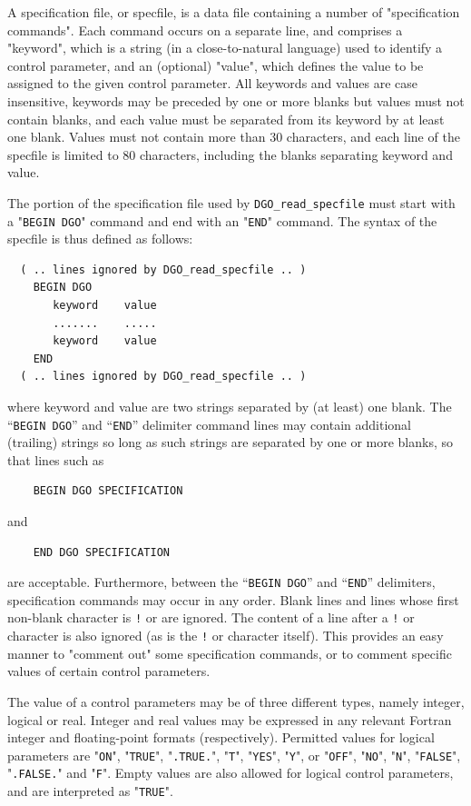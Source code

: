 \documentclass{galahad}
\newcommand{\packagename}{DGO}
\begin{document}
A specification file, or specfile, is a data file containing a number of
"specification commands". Each command occurs on a separate line,
and comprises a "keyword",
which is a string (in a close-to-natural language) used to identify a
control parameter, and
an (optional) "value", which defines the value to be assigned to the given
control parameter. All keywords and values are case insensitive,
keywords may be preceded by one or more blanks but
values must not contain blanks, and
each value must be separated from its keyword by at least one blank.
Values must not contain more than 30 characters, and
each line of the specfile is limited to 80 characters,
including the blanks separating keyword and value.

The portion of the specification file used by
{\tt \packagename\_read\_specfile}
must start
with a "{\tt BEGIN \packagename}" command and end with an
"{\tt END}" command.  The syntax of the specfile is thus defined as follows:
\begin{verbatim}
  ( .. lines ignored by DGO_read_specfile .. )
    BEGIN DGO
       keyword    value
       .......    .....
       keyword    value
    END
  ( .. lines ignored by DGO_read_specfile .. )
\end{verbatim}
where keyword and value are two strings separated by (at least) one blank.
The ``{\tt BEGIN \packagename}'' and ``{\tt END}'' delimiter command lines
may contain additional (trailing) strings so long as such strings are
separated by one or more blanks, so that lines such as
\begin{verbatim}
    BEGIN DGO SPECIFICATION
\end{verbatim}
and
\begin{verbatim}
    END DGO SPECIFICATION
\end{verbatim}
are acceptable. Furthermore,
between the
``{\tt BEGIN \packagename}'' and ``{\tt END}'' delimiters,
specification commands may occur in any order.  Blank lines and
lines whose first non-blank character is {\tt !} or {\tt *} are ignored.
The content
of a line after a {\tt !} or {\tt *} character is also
ignored (as is the {\tt !} or {\tt *}
character itself). This provides an easy manner to "comment out" some
specification commands, or to comment specific values
of certain control parameters.

The value of a control parameters may be of three different types, namely
integer, logical or real.
Integer and real values may be expressed in any relevant Fortran integer and
floating-point formats (respectively). Permitted values for logical
parameters are "{\tt ON}", "{\tt TRUE}", "{\tt .TRUE.}", "{\tt T}",
"{\tt YES}", "{\tt Y}", or "{\tt OFF}", "{\tt NO}",
"{\tt N}", "{\tt FALSE}", "{\tt .FALSE.}" and "{\tt F}".
Empty values are also allowed for
logical control parameters, and are interpreted as "{\tt TRUE}".
\end{document}
